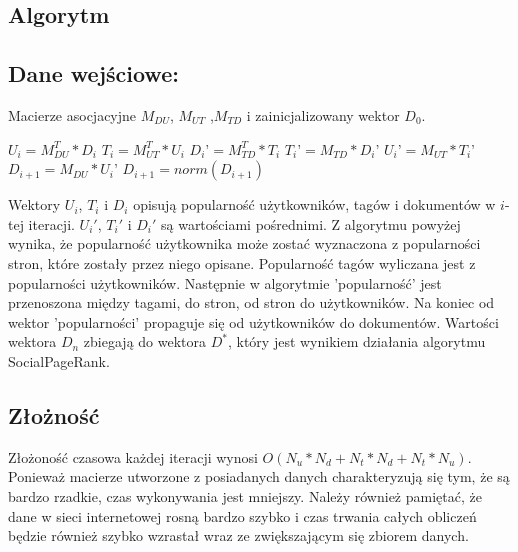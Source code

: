 \subsection{Algorytm}
\subsection*{Dane wejściowe:}
Macierze asocjacyjne $M_{DU}$, $M_{UT}$ ,$M_{TD}$ i zainicjalizowany wektor $D_0$.
\begin{center}
\begin{algorithmic}
\REPEAT
\STATE $U_i = M_{DU}^T * D_i$
\STATE $T_i = M_{UT}^T * U_i$
\STATE $D_i’ = M_{TD}^T * T_i$
\STATE $T_i’ = M_{TD}  * D_i’$
\STATE $U_i’ = M_{UT} * T_i’$
\STATE $D_{i+1}= M_{DU} * U_i’$
\STATE $D_{i+1}=norm(D_{i+1})$
\end{algorithmic}
\end{center}

Wektory $U_i$, $T_i$ i $D_i$ opisują popularność użytkowników, tagów i dokumentów w $i$-tej iteracji. $U_i'$, $T_i'$ i $D_i'$ są wartościami pośrednimi. Z algorytmu powyżej wynika, że popularność użytkownika może zostać wyznaczona z popularności stron, które zostały przez niego opisane.  Popularność tagów wyliczana jest z popularności użytkowników. Następnie w algorytmie 'popularność' jest przenoszona między tagami, do stron, od stron do użytkowników. Na koniec od wektor 'popularności' propaguje się od użytkowników do dokumentów. Wartości wektora $D_n$ zbiegają do wektora $D^*$, który jest wynikiem działania algorytmu SocialPageRank.


\subsection*{Złożność}
Złożoność czasowa każdej iteracji wynosi $O(N_u*N_d + N_t*N_d + N_t*N_u)$. Ponieważ macierze utworzone z posiadanych danych charakteryzują się tym, że są bardzo rzadkie, czas wykonywania jest mniejszy. Należy również pamiętać, że dane w sieci internetowej rosną bardzo szybko i czas trwania całych obliczeń będzie również szybko wzrastał wraz ze zwiększającym się zbiorem danych.


















